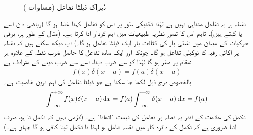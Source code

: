 \begin{figure}
\centering
{}
\caption{ڈیراک ڈیلٹا تفاعل (مساوات )}
\label{شکل_غیر_تابع_ڈیراک_ڈیلٹا_تفاعل}
\end{figure}

نقطہ  پر یہ تفاعل متناہی نہیں ہے لہٰذا تکنیکی طور پر اس کو تفاعل کہنا غلط ہو گا (ریاضی دان اسے  یا  کہتے ہیں)۔ تاہم اس کا تصور نظریہ طبیعیات میں اہم کردار ادا کرتا ہے۔ (مثال کے طور پر، برقی حرکیات کے میدان میں نقطی بار کی کثافت بار ایک ڈیلٹا تفاعل ہو گا۔) آپ دیکھ سکتے ہیں کہ  نقطہ  پر اکائی رقبہ کا نوکیلی تفاعل ہو گا۔ چونکہ  اور ایک سادہ تفاعل  کا حاصل ضرب نقطہ  کے علاوہ ہر مقام پر صفر ہو گا لہٰذا  کو  سے ضرب دینا، اسے  سے ضرب دینے کے مترادف ہے:
\begin{align}
f(x)\delta(x-a)=f(a)\delta(x-a)
\end{align}
بالخصوص درج ذیل لکھا جا سکتا ہے جو ڈیلٹا تفاعل کی اہم ترین خاصیت ہے۔ 
\begin{align}\label{مساوات_شروڈنگر_ڈیلٹا_تفاعل_اٹھاتا_ہے}
\int_{-\infty}^{+\infty}f(x)\delta(x-a)\dif{x}=f(a)\int_{-\infty}^{+\infty}\delta(x-a)\dif{x}=f(a)
\end{align}
 تکمل کی علامت کے اندر یہ نقطہ  پر تفاعل  کی قیمت "اٹھاتا" ہے۔ (لازمی نہیں کہ تکمل  تا  ہو، صرف اتنا ضروری ہے کہ تکمل کے دائرہ کار میں نقطہ  شامل ہو لہٰذا  تا  تکمل لینا کافی ہو گا جہاں  ہے۔) 

